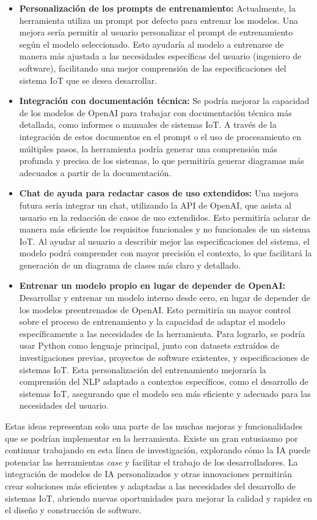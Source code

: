\begin{itemize}
	\item \textbf{Personalización de los prompts de entrenamiento:} Actualmente, la herramienta utiliza un prompt por defecto para entrenar los modelos. Una mejora sería permitir al usuario personalizar el prompt de entrenamiento según el modelo seleccionado. Esto ayudaría al modelo a entrenarse de manera más ajustada a las necesidades específicas del usuario (ingeniero de software), facilitando una mejor comprensión de las especificaciones del sistema IoT que se desea desarrollar.
	
	\item \textbf{Integración con documentación técnica: } Se podría mejorar la capacidad de los modelos de OpenAI para trabajar con documentación técnica más detallada, como informes o manuales de sistemas IoT. A través de la integración de estos documentos en el prompt o el uso de procesamiento en múltiples pasos, la herramienta podría generar una comprensión más profunda y precisa de los sistemas, lo que permitiría generar diagramas más adecuados a partir de la documentación.
	
	\item \textbf{Chat de ayuda para redactar casos de uso extendidos:} Una mejora futura sería integrar un chat, utilizando la API de OpenAI, que asista al usuario en la redacción de casos de uso extendidos. Esto permitiría aclarar de manera más eficiente los requisitos funcionales y no funcionales de un sistema IoT. Al ayudar al usuario a describir mejor las especificaciones del sistema, el modelo podrá comprender con mayor precisión el contexto, lo que facilitará la generación de un diagrama de clases más claro y detallado.
	
	\item \textbf{Entrenar un modelo propio en lugar de depender de OpenAI:} Desarrollar y entrenar un modelo interno desde cero, en lugar de depender de los modelos preentrenados de OpenAI. Esto permitiría un mayor control sobre el proceso de entrenamiento y la capacidad de adaptar el modelo específicamente a las necesidades de la herramienta. Para lograrlo, se podría usar Python como lenguaje principal, junto con datasets extraídos de investigaciones previas, proyectos de software existentes, y especificaciones de sistemas IoT. Esta personalización del entrenamiento mejoraría la comprensión del NLP adaptado a contextos específicos, como el desarrollo de sistemas IoT, asegurando que el modelo sea más eficiente y adecuado para las necesidades del usuario.
	
\end{itemize}

Estas ideas representan solo una parte de las muchas mejoras y funcionalidades que se podrían implementar en la herramienta. Existe un gran entusiasmo por continuar trabajando en esta línea de investigación, explorando cómo la IA puede potenciar las herramientas \textit{case} y facilitar el trabajo de los desarrolladores. La integración de modelos de IA personalizados y otras innovaciones permitirán crear soluciones más eficientes y adaptadas a las necesidades del desarrollo de sistemas IoT, abriendo nuevas oportunidades para mejorar la calidad y rapidez en el diseño y construcción de software.